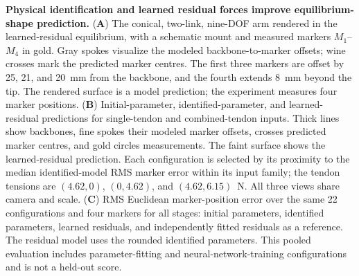 \caption{\textbf{Physical identification and learned residual forces improve equilibrium-shape prediction.}
(\textbf{A}) The conical, two-link, nine-DOF arm rendered in the learned-residual equilibrium, with a schematic mount and measured markers $M_1$--$M_4$ in gold. Gray spokes visualize the modeled backbone-to-marker offsets; wine crosses mark the predicted marker centres. The first three markers are offset by 25, 21, and 20~mm from the backbone, and the fourth extends 8~mm beyond the tip. The rendered surface is a model prediction; the experiment measures four marker positions.
(\textbf{B}) Initial-parameter, identified-parameter, and learned-residual predictions for single-tendon and combined-tendon inputs. Thick lines show backbones, fine spokes their modeled marker offsets, crosses predicted marker centres, and gold circles measurements. The faint surface shows the learned-residual prediction. Each configuration is selected by its proximity to the median identified-model RMS marker error within its input family; the tendon tensions are $(4.62,0)$, $(0,4.62)$, and $(4.62,6.15)$~N. All three views share camera and scale.
(\textbf{C}) RMS Euclidean marker-position error over the same 22 configurations and four markers for all stages: initial parameters, identified parameters, learned residuals, and independently fitted residuals as a reference. The residual model uses the rounded identified parameters. This pooled evaluation includes parameter-fitting and neural-network-training configurations and is not a held-out score.}

